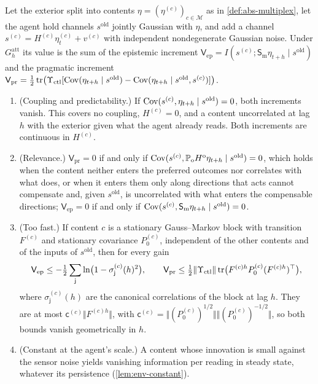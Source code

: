 \begin{proposition}\label{prop:env-selection}
Let the exterior split into contents $\eta=(\eta^{(c)})_{c\in\mathcal M}$ as in \cref{def:abs-multiplex}, let the agent hold channels $s^{\mathrm{old}}$ jointly Gaussian with $\eta$, and add a channel $s^{(c)}=H^{(c)}\eta^{(c)}_t+v^{(c)}$ with independent nondegenerate Gaussian noise. Under $G^{\mathrm{att}}_h$ its value is the sum of the epistemic increment $\mathsf V_{\mathrm{ep}}=I(s^{(c)};\mathsf S_{\mathrm m}\eta_{t+h}\mid s^{\mathrm{old}})$ and the pragmatic increment $\mathsf V_{\mathrm{pr}}=\frac12\operatorname{tr}\bigl(\Upsilon_{\mathrm{ctl}}[\operatorname{Cov}(\eta_{t+h}\mid s^{\mathrm{old}})-\operatorname{Cov}(\eta_{t+h}\mid s^{\mathrm{old}},s^{(c)})]\bigr)$.
\begin{enumerate}
\item[(i)] (Coupling and predictability.) If $\operatorname{Cov}(s^{(c)},\eta_{t+h}\mid s^{\mathrm{old}})=0$, both increments vanish. This covers no coupling, $H^{(c)}=0$, and a content uncorrelated at lag $h$ with the exterior given what the agent already reads. Both increments are continuous in $H^{(c)}$.
\item[(ii)] (Relevance.) $\mathsf V_{\mathrm{pr}}=0$ if and only if $\operatorname{Cov}(s^{(c)},\mathbb P_{\mathrm o}H^{\mathrm o}\eta_{t+h}\mid s^{\mathrm{old}})=0$, which holds when the content neither enters the preferred outcomes nor correlates with what does, or when it enters them only along directions that acts cannot compensate and, given $s^{\mathrm{old}}$, is uncorrelated with what enters the compensable directions; $\mathsf V_{\mathrm{ep}}=0$ if and only if $\operatorname{Cov}(s^{(c)},\mathsf S_{\mathrm m}\eta_{t+h}\mid s^{\mathrm{old}})=0$.
\item[(iii)] (Too fast.) If content $c$ is a stationary Gauss--Markov block with transition $F^{(c)}$ and stationary covariance $P^{(c)}_0$, independent of the other contents and of the inputs of $s^{\mathrm{old}}$, then for every gain
\[
\mathsf V_{\mathrm{ep}}\le-\tfrac12\sum_{\mathsf j}\ln\bigl(1-\sigma^{(c)}_{\mathsf j}(h)^2\bigr),\qquad\mathsf V_{\mathrm{pr}}\le\tfrac12\Vert\Upsilon_{\mathrm{ctl}}\Vert\operatorname{tr}\bigl(F^{(c)h}P^{(c)}_0(F^{(c)h})^\top\bigr),
\]
where $\sigma^{(c)}_{\mathsf j}(h)$ are the canonical correlations of the block at lag $h$. They are at most $\mathsf c^{(c)}\Vert F^{(c)h}\Vert$, with $\mathsf c^{(c)}=\Vert(P^{(c)}_0)^{1/2}\Vert\Vert(P^{(c)}_0)^{-1/2}\Vert$, so both bounds vanish geometrically in $h$.
\item[(iv)] (Constant at the agent's scale.) A content whose innovation is small against the sensor noise yields vanishing information per reading in steady state, whatever its persistence (\cref{lem:env-constant}).
\end{enumerate}
\end{proposition}

